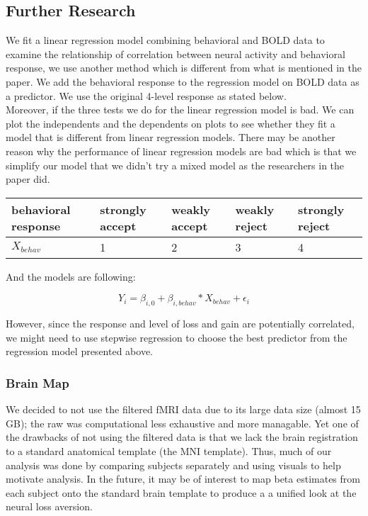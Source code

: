 \subsection{Further Research}

We fit a linear regression model combining behavioral and BOLD data to examine 
the relationship of correlation between neural activity and behavioral 
response, we use another method which is different from what is mentioned in 
the paper. We add the behavioral response to the regression model on BOLD data 
as a predictor. We use the original 4-level response as stated below. \\ 

Moreover, if the three tests we do for the linear regression model is bad. We 
can plot the independents and the dependents on plots to see whether they fit a 
model that is different from linear regression models. There may be another 
reason why the performance of linear regression models are bad which is that we 
simplify our model that we didn’t try a mixed model as the researchers in the 
paper did.

\begin{tabular}{lllll}
\hline
behavioral response & strongly accept & weakly accept & weakly reject & 
strongly reject\\ 
\hline
$X_{behav}$ & 1 & 2 & 3 & 4 \\
\hline
\end{tabular}

And the models are following:

\begin{equation}
Y_{i} = \beta_{i, 0} + \beta_{i, behav} * X_{behav} + \epsilon_i
\end{equation}

However, since the response and level of loss and gain are potentially 
correlated, we might need to use stepwise regression to choose the best 
predictor from the regression model presented above.

\subsubsection{Brain Map}
We decided to not use the filtered fMRI data due to its large data size (almost
15 GB); the raw was computational less exhaustive and more managable. Yet one of
the drawbacks of not using the filtered data is that we lack the brain 
registration to a standard anatomical template (the MNI template). Thus, 
much of our analysis was done by comparing subjects separately and using 
visuals to help motivate analysis. In the future, it may be of interest to map
beta estimates from each subject onto the standard brain template to produce a 
a unified look at the neural loss aversion. 

